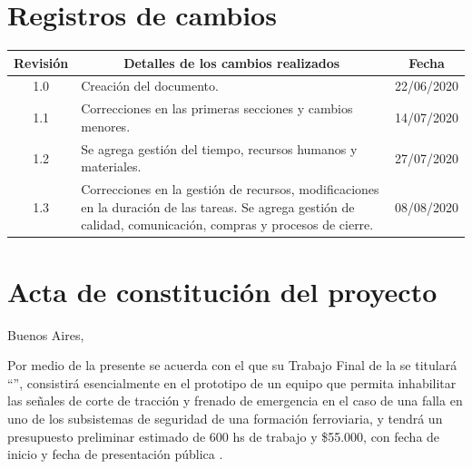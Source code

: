 \documentclass[11pt]{charter}
\begin{document}
\maketitle
\thispagestyle{empty}
\pagebreak


\thispagestyle{empty}
{\setlength{\parskip}{0pt}
\tableofcontents{}
}
\pagebreak


\section{Registros de cambios}
\label{sec:registro}


\begin{table}[ht]
\label{tab:registro}
\centering

\begin{tabularx}{\linewidth}{@{}|c|X|c|@{}}
\hline
\rowcolor[HTML]{C0C0C0} 
Revisión & \multicolumn{1}{c|}{\cellcolor[HTML]{C0C0C0}Detalles de los cambios realizados}     & Fecha      \\ \hline
1.0      & Creación del documento.                                                             & 22/06/2020 \\ \hline
1.1      & Correcciones en las primeras secciones y cambios menores.                           & 14/07/2020 \\ \hline
1.2      & Se agrega gestión del tiempo, recursos humanos y materiales.                        & 27/07/2020 \\ \hline
1.3      & Correcciones en la gestión de recursos, modificaciones en la duración de las tareas.
           Se agrega gestión de calidad, comunicación, compras y procesos de cierre.           & 08/08/2020 \\ \hline
\end{tabularx}
\end{table}

\pagebreak

\section{Acta de constitución del proyecto}
\label{sec:acta}

\begin{flushright}
Buenos Aires, \fechaInicioName
\end{flushright}

\vspace{2cm}

Por medio de la presente se acuerda con el \authorname\hspace{1px} que su Trabajo Final de la \degreename\hspace{1px} 
se titulará ``\ttitle'', consistirá esencialmente en el prototipo de un equipo que permita inhabilitar las señales de 
corte de tracción y frenado de emergencia en el caso de una falla en uno de los subsistemas de seguridad de una 
formación ferroviaria, y tendrá un presupuesto preliminar estimado de 600 hs de trabajo y \$55.000, con 
fecha de inicio \fechaInicioName\hspace{1px} y fecha de presentación pública \fechaFinalName.
\end{document}
